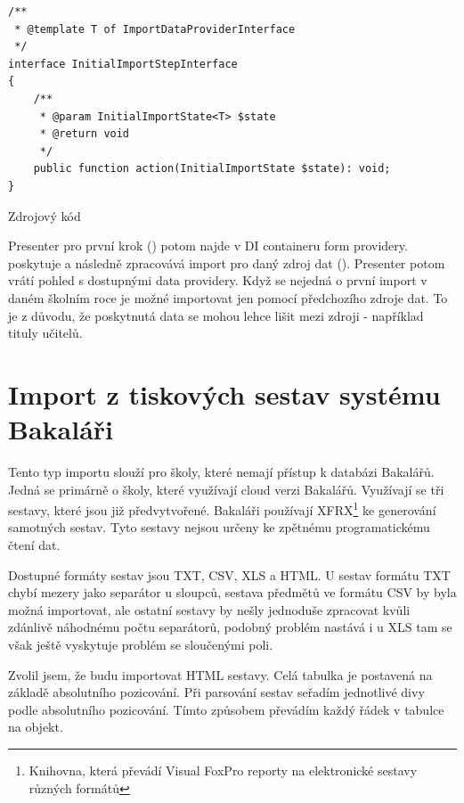\begin{code}[H]

  \begin{verbatim}
/**
 * @template T of ImportDataProviderInterface
 */
interface InitialImportStepInterface
{
    /**
     * @param InitialImportState<T> $state
     * @return void
     */
    public function action(InitialImportState $state): void;
}
   \end{verbatim}
  \caption{Zdrojový kód }

\end{code}


Presenter pro první krok () potom najde v DI containeru form providery.
 poskytuje a následně zpracovává import pro daný zdroj dat ().
Presenter potom vrátí pohled s dostupnými data providery.
Když se nejedná o první import v daném školním roce je možné importovat jen pomocí předchozího zdroje dat.
To je z důvodu, že poskytnutá data se mohou lehce lišit mezi zdroji - například tituly učitelů. 





\section{Import z tiskových sestav systému Bakaláři}
Tento typ importu slouží pro školy, které nemají přístup k databázi Bakalářů. 
Jedná se primárně o školy, které využívají cloud verzi Bakalářů. Využívají se tři sestavy, které jsou již předvytvořené. Bakaláři používají XFRX\footnote{Knihovna, která převádí Visual FoxPro reporty na elektronické sestavy různých formátů} ke generování samotných sestav. Tyto sestavy nejsou určeny ke zpětnému programatickému čtení dat.

Dostupné formáty sestav jsou TXT, CSV, XLS a HTML. U sestav formátu TXT chybí mezery jako separátor u sloupců, sestava předmětů ve formátu CSV by byla možná importovat, ale ostatní sestavy by nešly jednoduše zpracovat kvůli zdánlivě náhodnému počtu separátorů, podobný problém nastává i u XLS tam se však ještě vyskytuje problém se sloučenými poli.

Zvolil jsem, že budu importovat HTML sestavy. Celá tabulka je postavená na základě absolutního pozicování. Při parsování sestav seřadím jednotlivé divy podle absolutního pozicování. Tímto způsobem převádím každý řádek v tabulce na objekt.

